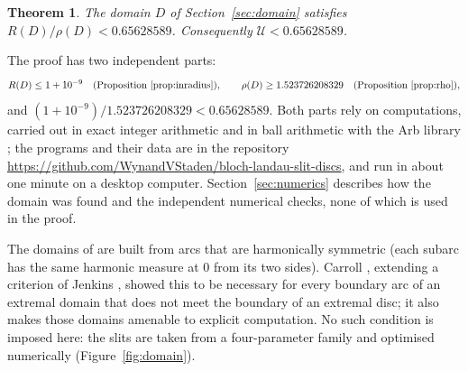 \documentclass[11pt]{amsart}
\newtheorem{theorem}{Theorem}
\theoremstyle{remark}
\newcommand{\U}{\mathcal U}
\begin{document}
\begin{table}[h]
\centering\small\setlength{\tabcolsep}{4pt}
\caption{Upper bounds for $\U$. The value of \cite{COC} is the numerical evaluation of an explicit formula. The
values of \cite{BH} and \cite{OCP} are numerical; the authors of \cite{OCP} state that they have not done a
rigorous error analysis. Lower bounds go back to Landau \cite{Lan} and were improved by several authors (see
\cite{COC} for references); the best known to us is $0.5708858$ \cite{Sk}.}\label{tab:history}
\end{table}

\begin{theorem}\label{thm:main}
The domain $D$ of Section~\ref{sec:domain} satisfies $R(D)/\rho(D)<0.65628589$. Consequently $\U<0.65628589$.
\end{theorem}

The proof has two independent parts:
\[
R(D)\le 1+10^{-9}\quad\text{(Proposition \ref{prop:inradius})},\qquad
\rho(D)\ge 1.523726208329\quad\text{(Proposition \ref{prop:rho})},
\]
and $(1+10^{-9})/1.523726208329<0.65628589$.
Both parts rely on computations, carried out in exact integer arithmetic and in ball arithmetic with the Arb
library \cite{Arb}; the programs and their data are in the repository
\url{https://github.com/WynandVStaden/bloch-landau-slit-discs}, and run in about one minute on a desktop
computer.
Section~\ref{sec:numerics} describes how the domain was found and the independent numerical checks, none of
which is used in the proof.

The domains of \cite{COC,OCP} are built from arcs that are harmonically symmetric (each subarc has the same
harmonic measure at $0$ from its two sides). Carroll \cite{Car}, extending a criterion of Jenkins \cite{Jen},
showed this to be necessary for every boundary arc of an extremal domain that does not meet the boundary of an
extremal disc; it also makes those domains amenable to explicit computation. No such condition is imposed here:
the slits are taken from a four-parameter family and optimised numerically (Figure~\ref{fig:domain}).
\end{document}
